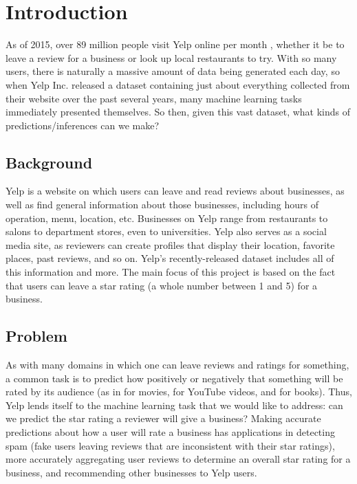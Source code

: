 \section{Introduction}

As of 2015, over 89 million people visit Yelp online per month \cite{yelp-stats}, whether it be to leave a review for a business or look up local restaurants to try. With so many users, there is naturally a massive amount of data being generated each day, so when Yelp Inc. released a dataset containing just about everything collected from their website over the past several years, many machine learning tasks immediately presented themselves. So then, given this vast dataset, what kinds of predictions/inferences can we make?

\subsection{Background}
Yelp is a website on which users can leave and read reviews about businesses, as well as find general information about those businesses, including hours of operation, menu, location, etc. Businesses on Yelp range from restaurants to salons to department stores, even to universities. Yelp also serves as a social media site, as reviewers can create profiles that display their location, favorite places, past reviews, and so on. Yelp's recently-released dataset includes all of this information and more. The main focus of this project is based on the fact that users can leave a star rating (a whole number between 1 and 5) for a business.

\subsection{Problem}
As with many domains in which one can leave reviews and ratings for something, a common task is to predict how positively or negatively that something will be rated by its audience (as in \cite{movie-ratings} for movies, \cite{youtube-ratings} for YouTube videos, and \cite{book-ratings} for books). Thus, Yelp lends itself to the machine learning task that we would like to address: can we predict the star rating a reviewer will give a business? Making accurate predictions about how a user will rate a business has applications in detecting spam (fake users leaving reviews that are inconsistent with their star ratings), more accurately aggregating user reviews to determine an overall star rating for a business, and recommending other businesses to Yelp users.
